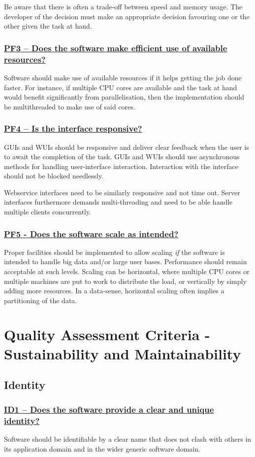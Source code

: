 \documentclass[a4paper,11pt]{article}
\newcommand{\indicator}[1]{\subsubsection*{\underline{#1}}}
\begin{document}
Be aware that there is often a trade-off between speed and memory usage. The
developer of the decision must make an appropriate decision favouring one or the other
given the task at hand. 

\indicator{PF3 -- Does the software make efficient use of available resources?}

Software should make use of available resources if it helps getting the job
done faster. For instance, if multiple CPU cores are available and the task at hand
would benefit significantly from parallelisation, then the implementation should be
multithreaded to make use of said cores.

\indicator{PF4 -- Is the interface responsive?}

GUIs and WUIs should be responsive and deliver clear feedback when the user is
to await the completion of the task. GUIs and WUIs should use asynchronous methods for
handling user-interface interaction. Interaction with the interface should not
be blocked needlessly.

Webservice interfaces need to be similarly responsive and not time out. Server
interfaces furthermore demands multi-threading and need to be able handle
multiple clients concurrently.

\indicator{PF5 - Does the software scale as intended?}

Proper facilities should be implemented to allow scaling \emph{if} the software is
intended to handle big data and/or large user bases. Performance should remain
acceptable at such levels.  Scaling can be horizontal, where multiple CPU cores
or multiple machines are put to work to distribute the load, or vertically by
simply adding more resources. In a data-sense, horizontal scaling often implies
a partitioning of the data.

\section{Quality Assessment Criteria - Sustainability and Maintainability}

\subsection{Identity}

\indicator{ID1 -- Does the software provide a clear and unique identity?}

Software should be identifiable by a clear name that does not clash with others
in its application domain and in the wider generic software domain. 
\end{document}
